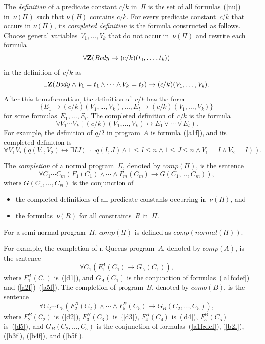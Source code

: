 \documentclass[11pt]{article}
\def\lrar{\leftrightarrow}
\def\beq{\begin{equation}}
\def\eeq#1{\label{#1}\end{equation}}
\begin{document}
\begin{adjustwidth}{-1cm}{-1cm}
The \emph{definition} of a predicate constant $c/k$ in~$\Pi$ is the
set of all formulas~(\ref{nu}) in~$\nu(\Pi)$ such that $\nu(H)$ contains $c/k$.
For every predicate constant~$c/k$ that occurs in $\nu(\Pi)$, its
\emph{completed definition} is the formula constructed as follows.
Choose general variables~$V_1,\dots,V_k$ that do not occur in~$\nu(\Pi)$
and rewrite each formula
$$\forall {\bf Z}(\mathit{Body} \to (c/k)(t_1,\dots,t_k))$$
in the definition of~$c/k$ as
$$\exists{\bf Z} (\mathit{Body}\land V_1=t_1\land\cdots
\land V_k=t_k) \to (c/k)(V_1,\dots,V_k).$$
After this transformation, the definition of~$c/k$ has the form
$$\{E_1 \to (c/k)(V_1,\dots,V_k),\dots,E_l \to (c/k)(V_1,\dots,V_k)\}$$
for some formulas~$E_1,\dots,E_l$.
The completed definition of~$c/k$ is the formula
$$\forall V_1\cdots V_k ((c/k)(V_1,\dots,V_k) \lrar E_1\lor\cdots\lor E_l).$$
For example, the definition of $q/2$ in program~$A$ is formula~(\ref{a1f}),
and its completed definition is
\beq
\forall V_1V_2(q(V_1,V_2)\lrar 
\exists I J(\neg\neg q(I,J) \land 1\leq I \leq n \land 1 \leq J \leq n
\land V_1=I\land V_2=J)).
\eeq{a1fcdef}

The \emph{completion} of a normal program~$\Pi$, denoted by
$\mathit{comp}(\Pi)$, is the sentence
$$\forall C_1\cdots C_m (F_1(C_1)\land\cdots\land F_m(C_m)
\to G(C_1,\dots,C_m)),$$
where $G(C_1,\dots,C_m)$ is the conjunction of
\begin{itemize}
\item   the completed definitions of all predicate constants occurring
  in~$\nu(\Pi)$, and
\item the formulas~$\nu(R)$ for all constraints~$R$ in~$\Pi$.
\end{itemize}
For a semi-normal program~$\Pi$, $\mathit{comp}(\Pi)$ is defined as
$\mathit{comp}(\mathit{normal}(\Pi))$.

For example, the completion of n-Queens program~$A$, denoted by $\mathit{comp}(A)$,  is the sentence
\beq
\forall C_1(F^A_1(C_1) \to G_A(C_1)),
\eeq{compA}
where $F^A_1(C_1)$ is~(\ref{d1}), and $G_A(C_1)$ is the conjunction of
formulas~(\ref{a1fcdef}) and (\ref{a2f})--(\ref{a5f}).
The completion of  program~$B$, denoted by $\mathit{comp}(B)$, is the sentence
\beq
\forall C_2\cdots C_5(F^B_2(C_2)\land\cdots \land F^B_5(C_5)\to
G_B(C_2,\dots,C_5)),
\eeq{compB}
where $F^B_2(C_2)$ is~(\ref{d2}), $F^B_3(C_3)$ is~(\ref{d3}), $F^B_4(C_4)$ is~(\ref{d4}),
$F^B_5(C_5)$ is~(\ref{d5}), and $G_B(C_2,\dots, C_5)$ is the conjunction of
formulas~(\ref{a1fcdef}), (\ref{b2f}), (\ref{b3f}), (\ref{b4f}),
and (\ref{b5f}).


\end{adjustwidth}
\end{document}
